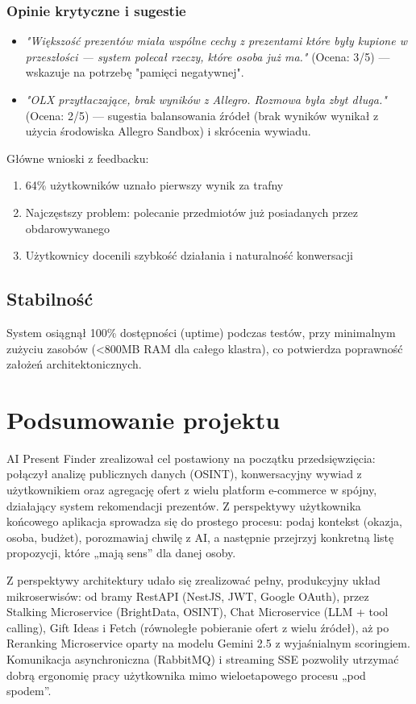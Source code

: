 \documentclass[12pt,a4paper]{article}
\begin{document}
\subsubsection*{Opinie krytyczne i sugestie}
\begin{itemize}
    \item \textit{"Większość prezentów miała wspólne cechy z prezentami które były kupione w przeszłości — system polecał rzeczy, które osoba już ma."} (Ocena: 3/5) — wskazuje na potrzebę "pamięci negatywnej".
    \item \textit{"OLX przytłaczające, brak wyników z Allegro. Rozmowa była zbyt długa."} (Ocena: 2/5) — sugestia balansowania źródeł (brak wyników wynikał z użycia środowiska Allegro Sandbox) i skrócenia wywiadu.
\end{itemize}

\noindent Główne wnioski z feedbacku:
\begin{enumerate}
    \item 64\% użytkowników uznało pierwszy wynik za trafny
    \item Najczęstszy problem: polecanie przedmiotów już posiadanych przez obdarowywanego
    \item Użytkownicy docenili szybkość działania i naturalność konwersacji
\end{enumerate}

\subsection{Stabilność}
System osiągnął 100\% dostępności (uptime) podczas testów, przy minimalnym zużyciu zasobów (<800MB RAM dla całego klastra), co potwierdza poprawność założeń architektonicznych.

\section{Podsumowanie projektu}

AI Present Finder zrealizował cel postawiony na początku przedsięwzięcia: połączył analizę publicznych danych (OSINT), konwersacyjny wywiad z użytkownikiem oraz agregację ofert z wielu platform e-commerce w spójny, działający system rekomendacji prezentów. Z perspektywy użytkownika końcowego aplikacja sprowadza się do prostego procesu: podaj kontekst (okazja, osoba, budżet), porozmawiaj chwilę z AI, a następnie przejrzyj konkretną listę propozycji, które „mają sens” dla danej osoby.

Z perspektywy architektury udało się zrealizować pełny, produkcyjny układ mikroserwisów: od bramy RestAPI (NestJS, JWT, Google OAuth), przez Stalking Microservice (BrightData, OSINT), Chat Microservice (LLM + tool calling), Gift Ideas i Fetch (równoległe pobieranie ofert z wielu źródeł), aż po Reranking Microservice oparty na modelu Gemini 2.5 z wyjaśnialnym scoringiem. Komunikacja asynchroniczna (RabbitMQ) i streaming SSE pozwoliły utrzymać dobrą ergonomię pracy użytkownika mimo wieloetapowego procesu „pod spodem”.
\end{document}
